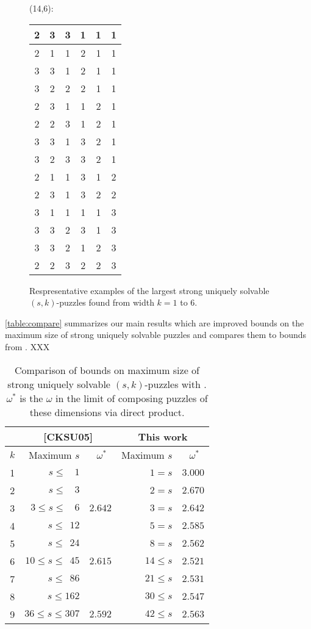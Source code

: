 \documentclass[11pt]{article}
\begin{document}
\begin{figure}
\begin{multicols}{4}
  (14,6):\\[.5ex]
  \begin{tabular}{|c|c|c|c|c|c|}
    \hline
    2&3&3&1&1&1 \\ \hline
    2&1&1&2&1&1 \\ \hline
    3&3&1&2&1&1 \\\hline
    3&2&2&2&1&1 \\\hline
    2&3&1&1&2&1 \\\hline
    2&2&3&1&2&1 \\\hline
    3&3&1&3&2&1 \\\hline
    3&2&3&3&2&1 \\\hline
    2&1&1&3&1&2 \\\hline
    2&3&1&3&2&2 \\\hline
    3&1&1&1&1&3 \\\hline
    3&3&2&3&1&3 \\\hline
    3&3&2&1&2&3 \\\hline
    2&2&3&2&2&3 \\\hline
  \end{tabular}
  \end{multicols}
  \caption{Respresentative examples of the largest strong uniquely
    solvable $(s,k)$-puzzles found from width $k = 1$ to $6$.}
\end{figure}

\autoref{table:compare} summarizes our main results which are
improved bounds on the maximum size of strong uniquely solvable
puzzles and compares them to bounds from \cite{cksu05}.  XXX
\begin{table}
  \label{table:compare}
  \begin{center}
  \begin{tabular}{|c|r|r|r|r|}
    \hline
    & \multicolumn{2}{|c|}{[CKSU05]} & \multicolumn{2}{|c|}{This work} \\
    \hline
    $k$ & Maximum $s$ & $\omega^*$~ & Maximum $s$ & $\omega^*$~\\
    \hline
    1 & $s\le ~~~~1$ & & $1=s$ & $3.000$  \\
    2 & $s\le ~~~~3$ & & $2=s$ & $2.670$ \\
    3 & $3 \le s \le ~~~~6$ & $2.642$ & $3=s$ & $2.642$ \\
    4 & $s\le ~~12$ & & $5=s$ & $2.585$ \\
    5 & $s\le ~~24$ & & $8=s$ & $2.562$  \\
    6 & $10 \le s \le ~~45$ & $2.615$ &$14\le s$ & $2.521$\\
    7 & $s\le ~~86$ & & $21\le s$ & $2.531$ \\
    8 & $s\le 162$ & & $30\le s$ & $2.547$ \\
    9 & $36 \le s \le 307$ & $2.592$ &$42\le s$ & $2.563$  \\
    \hline
  \end{tabular}
  \end{center}
  \caption{Comparison of bounds on maximum size of strong uniquely
    solvable $(s,k)$-puzzles with \cite{cksu05}.  $\omega^*$ is the
    $\omega$ in the limit of composing puzzles of these dimensions via
    direct product.}
\end{table}
  
\end{document}
